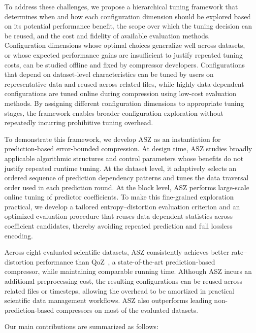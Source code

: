 To address these challenges, we propose a hierarchical tuning framework that determines when and how each configuration dimension should be explored based on its potential performance benefit, the scope over which the tuning decision can be reused, and the cost and fidelity of available evaluation methods. Configuration dimensions whose optimal choices generalize well across datasets, or whose expected performance gains are insufficient to justify repeated tuning costs, can be studied offline and fixed by compressor developers. Configurations that depend on dataset-level characteristics can be tuned by users on representative data and reused across related files, while highly data-dependent configurations are tuned online during compression using low-cost evaluation methods. By assigning different configuration dimensions to appropriate tuning stages, the framework enables broader configuration exploration without repeatedly incurring prohibitive tuning overhead.

To demonstrate this framework, we develop ASZ as an instantiation for prediction-based error-bounded compression. At design time, ASZ studies broadly applicable algorithmic structures and control parameters whose benefits do not justify repeated runtime tuning. At the dataset level, it adaptively selects an ordered sequence of prediction dependency patterns and tunes the data traversal order used in each prediction round. At the block level, ASZ performs large-scale online tuning of predictor coefficients. To make this fine-grained exploration practical, we develop a tailored entropy–distortion evaluation criterion and an optimized evaluation procedure that reuses data-dependent statistics across coefficient candidates, thereby avoiding repeated prediction and full lossless encoding.

Across eight evaluated scientific datasets, ASZ consistently achieves better rate–distortion performance than QoZ~\cite{liu2022dynamic,liu2024high}, a state-of-the-art prediction-based compressor, while maintaining comparable running time. Although ASZ incurs an additional preprocessing cost, the resulting configurations can be reused across related files or timesteps, allowing the overhead to be amortized in practical scientific data management workflows. ASZ also outperforms leading non-prediction-based compressors on most of the evaluated datasets.

Our main contributions are summarized as follows:

